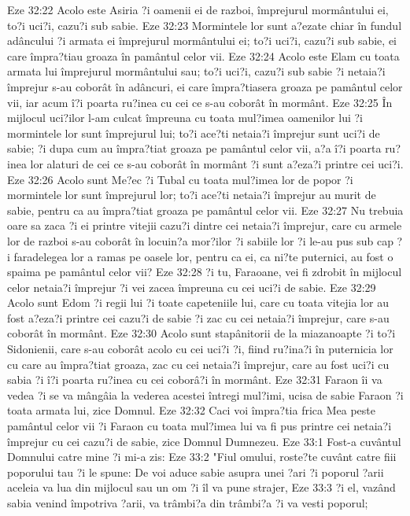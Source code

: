 Eze 32:22  Acolo este Asiria ?i oamenii ei de razboi, împrejurul mormântului ei, to?i uci?i, cazu?i sub sabie.
Eze 32:23  Mormintele lor sunt a?ezate chiar în fundul adâncului ?i armata ei împrejurul mormântului ei; to?i uci?i, cazu?i sub sabie, ei care împra?tiau groaza în pamântul celor vii.
Eze 32:24  Acolo este Elam cu toata armata lui împrejurul mormântului sau; to?i uci?i, cazu?i sub sabie ?i netaia?i împrejur s-au coborât în adâncuri, ei care împra?tiasera groaza pe pamântul celor vii, iar acum î?i poarta ru?inea cu cei ce s-au coborât în mormânt.
Eze 32:25  În mijlocul uci?ilor l-am culcat împreuna cu toata mul?imea oamenilor lui ?i mormintele lor sunt împrejurul lui; to?i ace?ti netaia?i împrejur sunt uci?i de sabie; ?i dupa cum au împra?tiat groaza pe pamântul celor vii, a?a î?i poarta ru?inea lor alaturi de cei ce s-au coborât în mormânt ?i sunt a?eza?i printre cei uci?i.
Eze 32:26  Acolo sunt Me?ec ?i Tubal cu toata mul?imea lor de popor ?i mormintele lor sunt împrejurul lor; to?i ace?ti netaia?i împrejur au murit de sabie, pentru ca au împra?tiat groaza pe pamântul celor vii.
Eze 32:27  Nu trebuia oare sa zaca ?i ei printre vitejii cazu?i dintre cei netaia?i împrejur, care cu armele lor de razboi s-au coborât în locuin?a mor?ilor ?i sabiile lor ?i le-au pus sub cap ?i faradelegea lor a ramas pe oasele lor, pentru ca ei, ca ni?te puternici, au fost o spaima pe pamântul celor vii?
Eze 32:28  ?i tu, Faraoane, vei fi zdrobit în mijlocul celor netaia?i împrejur ?i vei zacea împreuna cu cei uci?i de sabie.
Eze 32:29  Acolo sunt Edom ?i regii lui ?i toate capeteniile lui, care cu toata vitejia lor au fost a?eza?i printre cei cazu?i de sabie ?i zac cu cei netaia?i împrejur, care s-au coborât în mormânt.
Eze 32:30  Acolo sunt stapânitorii de la miazanoapte ?i to?i Sidonienii, care s-au coborât acolo cu cei uci?i ?i, fiind ru?ina?i în puternicia lor cu care au împra?tiat groaza, zac cu cei netaia?i împrejur, care au fost uci?i cu sabia ?i î?i poarta ru?inea cu cei coborâ?i în mormânt.
Eze 32:31  Faraon îi va vedea ?i se va mângâia la vederea acestei întregi mul?imi, ucisa de sabie Faraon ?i toata armata lui, zice Domnul.
Eze 32:32  Caci voi împra?tia frica Mea peste pamântul celor vii ?i Faraon cu toata mul?imea lui va fi pus printre cei netaia?i împrejur cu cei cazu?i de sabie, zice Domnul Dumnezeu.
Eze 33:1  Fost-a cuvântul Domnului catre mine ?i mi-a zis:
Eze 33:2  "Fiul omului, roste?te cuvânt catre fiii poporului tau ?i le spune: De voi aduce sabie asupra unei ?ari ?i poporul ?arii aceleia va lua din mijlocul sau un om ?i îl va pune strajer,
Eze 33:3  ?i el, vazând sabia venind împotriva ?arii, va trâmbi?a din trâmbi?a ?i va vesti poporul;
